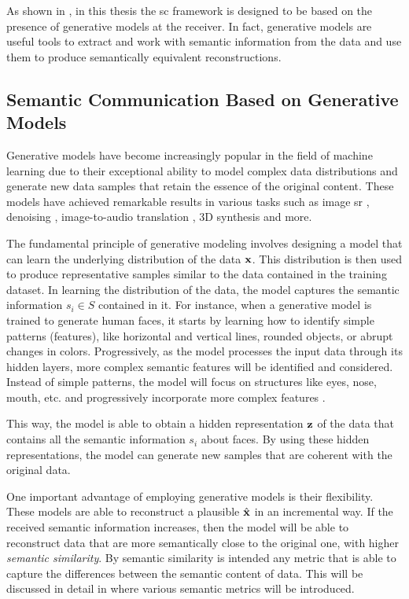 As shown in , in this thesis the \gls{sc} framework is designed to be based on the presence of generative models at the receiver. In fact, generative models are useful tools to extract and work with semantic information from the data and use them to produce semantically equivalent reconstructions.

\subsection{Semantic Communication Based on Generative Models}\label{sec: SEMCOM sem_gen}
Generative models have become increasingly popular in the field of machine learning due to their exceptional ability to model complex data distributions and generate new data samples that retain the essence of the original content. These models have achieved remarkable results in various tasks such as image \gls{sr} \cite{Ledig2017Photo}, denoising \cite{Vincent2010Stacked}, image-to-audio translation \cite{Zhou2017Visual}, 3D synthesis \cite{Wu2016Learning} and more.

The fundamental principle of generative modeling involves designing a model that can learn the underlying distribution of the data $\mathbf{x}$. This distribution is then used to produce representative samples similar to the data contained in the training dataset. In learning the distribution of the data, the model captures the semantic information $s_i \in S$ contained in it. For instance, when a generative model is trained to generate human faces, it starts by learning how to identify simple patterns (features), like horizontal and vertical lines, rounded objects, or abrupt changes in colors. Progressively, as the model processes the input data through its hidden layers, more complex semantic features will be identified and considered. Instead of simple patterns, the model will focus on structures like eyes, nose, mouth, etc. and progressively incorporate more complex features \cite{Karras2019Style, Zeiler2014Visualizing}.

This way, the model is able to obtain a hidden representation $\mathbf{z}$ of the data that contains all the semantic information $s_i$ about faces. By using these hidden representations, the model can generate new samples that are coherent with the original data.

One important advantage of employing generative models is their flexibility. These models are able to reconstruct a plausible $\hat{\mathbf{x}}$ in an incremental way. If the received semantic information increases, then the model will be able to reconstruct data that are more semantically close to the original one, with higher \textit{semantic similarity}. By semantic similarity is intended any metric that is able to capture the differences between the semantic content of data. This will be discussed in detail in  where various semantic metrics will be introduced.

